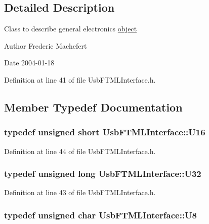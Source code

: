 \subsection{Detailed Description}
Class to describe general electronics \hyperlink{namespaceobject}{object}

\begin{DoxyAuthor}{Author}
Frederic Machefert 
\end{DoxyAuthor}
\begin{DoxyDate}{Date}
2004-\/01-\/18 
\end{DoxyDate}


Definition at line 41 of file UsbFTMLInterface.h.

\subsection{Member Typedef Documentation}
\hypertarget{classUsbFTMLInterface_a5909beb462dc45c772d6f7ae79312ad7}{
\subsubsection[{U16}]{\setlength{\rightskip}{0pt plus 5cm}typedef unsigned short {\bf UsbFTMLInterface::U16}}}
\label{classUsbFTMLInterface_a5909beb462dc45c772d6f7ae79312ad7}


Definition at line 44 of file UsbFTMLInterface.h.\hypertarget{classUsbFTMLInterface_a142f8ce4b5873c295af8945f3894ae38}{
\subsubsection[{U32}]{\setlength{\rightskip}{0pt plus 5cm}typedef unsigned long {\bf UsbFTMLInterface::U32}}}
\label{classUsbFTMLInterface_a142f8ce4b5873c295af8945f3894ae38}


Definition at line 43 of file UsbFTMLInterface.h.\hypertarget{classUsbFTMLInterface_af7c9f02ee6f59fefa68ef14f90dcbbd8}{
\subsubsection[{U8}]{\setlength{\rightskip}{0pt plus 5cm}typedef unsigned char {\bf UsbFTMLInterface::U8}}}
\label{classUsbFTMLInterface_af7c9f02ee6f59fefa68ef14f90dcbbd8}


